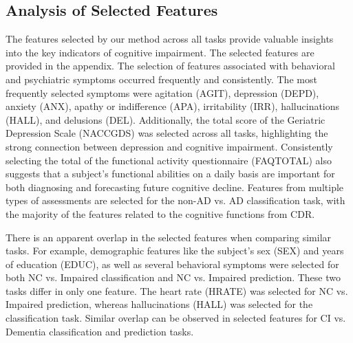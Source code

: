 \subsection{Analysis of Selected Features}
The features selected by our method across all tasks provide valuable insights into the key indicators of cognitive impairment. The selected features are provided in the appendix. The selection of features associated with behavioral and psychiatric symptoms occurred frequently and consistently. The most frequently selected symptoms were agitation (AGIT), depression (DEPD), anxiety (ANX), apathy or indifference (APA), irritability (IRR), hallucinations (HALL), and delusions (DEL). Additionally, the total score of the Geriatric Depression Scale (NACCGDS) was selected across all tasks, highlighting the strong connection between depression and cognitive impairment. Consistently selecting the total of the functional activity questionnaire (FAQTOTAL) also suggests that a subject's functional abilities on a daily basis are important for both diagnosing and forecasting future cognitive decline. Features from multiple types of assessments are selected for the non-AD vs. AD classification task, with the majority of the features related to the cognitive functions from CDR.

There is an apparent overlap in the selected features when comparing similar tasks. For example, demographic features like the subject's sex (SEX) and years of education (EDUC), as well as several behavioral symptoms were selected for both NC vs. Impaired classification and NC vs. Impaired prediction. These two tasks differ in only one feature. The heart rate (HRATE) was selected for NC vs. Impaired prediction, whereas hallucinations (HALL) was selected for the classification task. Similar overlap can be observed in selected features for CI vs. Dementia classification and prediction tasks.

